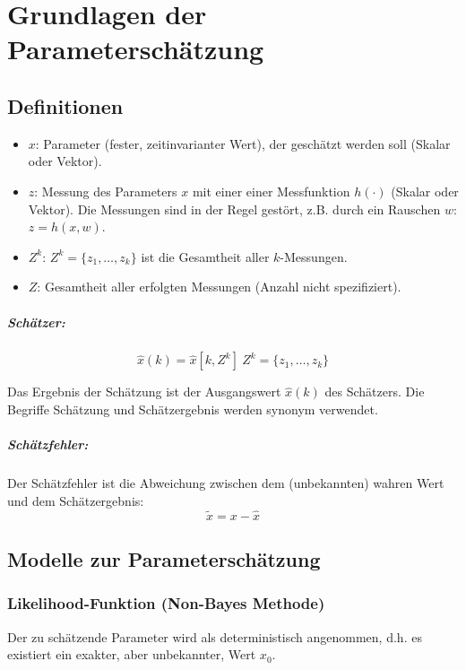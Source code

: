 \chapter{Grundlagen der Parameterschätzung}
\section{Definitionen}
\begin{itemize}
    \item $x$: Parameter (fester, zeitinvarianter Wert), der geschätzt werden soll (Skalar oder Vektor).
    \item $z$: Messung des Parameters $x$ mit einer einer Messfunktion $h(\cdot)$ (Skalar oder Vektor).
        Die Messungen sind in der Regel gestört, z.B. durch ein Rauschen $w$: $z = h(x, w)$.
    \item $Z^k$: $Z^k = \{z_1, \ldots, z_k\}$ ist die Gesamtheit aller $k$-Messungen.
    \item $Z$: Gesamtheit aller erfolgten Messungen (Anzahl nicht spezifiziert).
\end{itemize}

\paragraph{Schätzer:}
\begin{equation*}
    \hat{x}(k) = \hat{x}[k, Z^k]\ Z^k = \{z_1, \ldots, z_k\}
\end{equation*}

Das Ergebnis der Schätzung ist der Ausgangswert $\hat{x}(k)$ des Schätzers. 
Die Begriffe Schätzung und Schätzergebnis werden synonym verwendet.

\paragraph{Schätzfehler:}
Der Schätzfehler ist die Abweichung zwischen dem (unbekannten) wahren Wert und dem Schätzergebnis:
\begin{equation*}
    \tilde{x} = x - \hat{x}
\end{equation*}

\section{Modelle zur Parameterschätzung}
\subsection{Likelihood-Funktion (Non-Bayes Methode)}
Der zu schätzende Parameter wird als deterministisch angenommen, d.h. es existiert ein exakter, aber unbekannter, 
Wert $x_0$.


